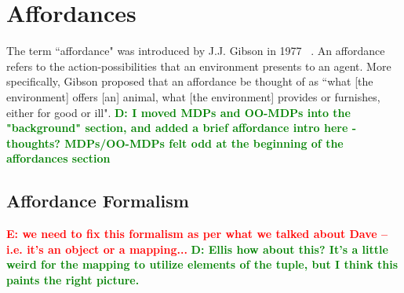 \documentclass[conference]{IEEEtran}
\newcommand{\dnote}[1]{\textcolor{Green}{\textbf{D: #1}}}
\newcommand{\enote}[1]{\textcolor{Red}{\textbf{E: #1}}}
\begin{document}



\section{Affordances}
\label{sec:affordances}

The term ``affordance" was introduced by J.J. Gibson in 1977 ~\citep{gibson77}. An affordance refers to the action-possibilities that an environment presents to an agent. More specifically, Gibson proposed that an affordance be thought of as ``what [the environment] offers [an] animal, what [the environment] provides or furnishes, either for good or ill".
\dnote{I moved MDPs and OO-MDPs into the "background" section, and added a brief affordance intro here - thoughts? MDPs/OO-MDPs felt odd at the beginning of the affordances section}

\subsection{Affordance Formalism}

\enote{we need to fix this formalism as per what we talked about Dave -- i.e. it's an object or a mapping...}
\dnote{Ellis how about this? It's a little weird for the mapping to utilize elements of the tuple, but I think this
paints the right picture.}
\end{document}
